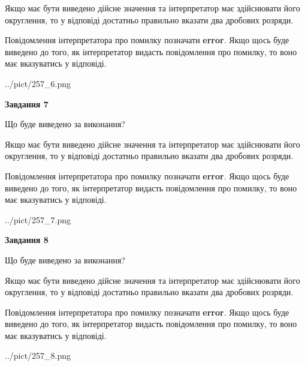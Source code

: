 \documentclass[12pt, ukrainian]{article}
\begin{document}
{\begin {Large}
Якщо має бути виведено дійсне значення та інтерпретатор має здійснювати його округлення, 
то у відповіді достатньо правильно вказати два дробових розряди.

Повідомлення інтерпретатора про помилку позначати \textbf{error}.
Якщо щось буде виведено до того, як інтерпретатор видасть повідомлення про помилку, 
то воно має вказуватись у відповіді. \par

\begin{center}
	{../pict/257_6.png}
\end{center}
\newpage

{\begin {center}\textbf{Завдання 7}\end {center}}\par
Що буде виведено за виконання? \par

Якщо має бути виведено дійсне значення та інтерпретатор має здійснювати його округлення, 
то у відповіді достатньо правильно вказати два дробових розряди.

Повідомлення інтерпретатора про помилку позначати \textbf{error}.
Якщо щось буде виведено до того, як інтерпретатор видасть повідомлення про помилку, 
то воно має вказуватись у відповіді. \par

\begin{center}
	{../pict/257_7.png}
\end{center}
\newpage

{\begin {center}\textbf{Завдання 8}\end {center}}\par
Що буде виведено за виконання? \par

Якщо має бути виведено дійсне значення та інтерпретатор має здійснювати його округлення, 
то у відповіді достатньо правильно вказати два дробових розряди.

Повідомлення інтерпретатора про помилку позначати \textbf{error}.
Якщо щось буде виведено до того, як інтерпретатор видасть повідомлення про помилку, 
то воно має вказуватись у відповіді. \par

\begin{center}
	{../pict/257_8.png}
\end{center}
\newpage


\end{Large}}
\end{document}
